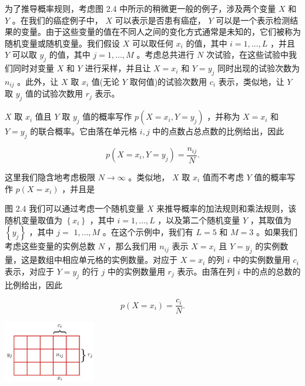 \documentclass[10pt]{report}
\begin{document}
为了推导概率规则，考虑图 2.4 中所示的稍微更一般的例子，涉及两个变量 \(X\) 和 \(Y\) 。在我们的癌症例子中， \(X\) 可以表示是否患有癌症， \(Y\) 可以是一个表示检测结果的变量。由于这些变量的值在不同人之间的变化方式通常是未知的，它们被称为随机变量或随机变量。我们假设 \(X\) 可以取任何 \({x}_{i}\) 的值，其中 \(i = 1,\ldots ,L\) ，并且 \(Y\) 可以取 \({y}_{j}\) 的值，其中 \(j = 1,\ldots ,M\) 。考虑总共进行 \(N\) 次试验，在这些试验中我们同时对变量 \(X\) 和 \(Y\) 进行采样，并且让 \(X = {x}_{i}\) 和 \(Y = {y}_{j}\) 同时出现的试验次数为 \({n}_{ij}\) 。此外，让 \(X\) 取 \({x}_{i}\) 值(无论 \(Y\) 取何值)的试验次数用 \({c}_{i}\) 表示，类似地，让 \(Y\) 取 \({y}_{j}\) 值的试验次数用 \({r}_{j}\) 表示。

\(X\) 取 \({x}_{i}\) 值且 \(Y\) 取 \({y}_{j}\) 值的概率写作 \(p\left( {X = {x}_{i},Y = {y}_{j}}\right)\) ，并称为 \(X = {x}_{i}\) 和 \(Y = {y}_{j}\) 的联合概率。它由落在单元格 \(i,j\) 中的点数占总点数的比例给出，因此

\[
p\left( {X = {x}_{i},Y = {y}_{j}}\right)  = \frac{{n}_{ij}}{N}. \tag{2.1}
\]

这里我们隐含地考虑极限 \(N \rightarrow  \infty\) 。类似地， \(X\) 取 \({x}_{i}\) 值而不考虑 \(Y\) 值的概率写作 \(p\left( {X = {x}_{i}}\right)\) ，并且是

图 2.4 我们可以通过考虑一个随机变量 \(X\) 来推导概率的加法规则和乘法规则，该随机变量取值为 \(\left\{  {x}_{i}\right\}\) ，其中 \(i = 1,\ldots ,L\) ，以及第二个随机变量 \(Y\) ，其取值为 \(\left\{  {y}_{j}\right\}\) ，其中 \(j =\)  \(1,\ldots ,M\) 。在这个示例中，我们有 \(L = 5\) 和 \(M = 3\) 。如果我们考虑这些变量的实例总数 \(N\) ，那么我们用 \({n}_{ij}\) 表示 \(X = {x}_{i}\) 且 \(Y = {y}_{j}\) 的实例数量，这是数组中相应单元格的实例数量。对应于 \(X = {x}_{i}\) 的列 \(i\) 中的实例数量用 \({c}_{i}\) 表示，对应于 \(Y = {y}_{j}\) 的行 \(j\) 中的实例数量用 \({r}_{j}\) 表示。由落在列 \(i\) 中的点的总数的比例给出，因此

\[
p\left( {X = {x}_{i}}\right)  = \frac{{c}_{i}}{N}. \tag{2.2}
\]

\begin{center}
\includegraphics[max width=0.3\textwidth]{images/0194e279-9b28-703a-88f4-c3ac21e2010d_46_1083_344_466_312_0.jpg}
\end{center}
\hspace*{3em} 
\end{document}
